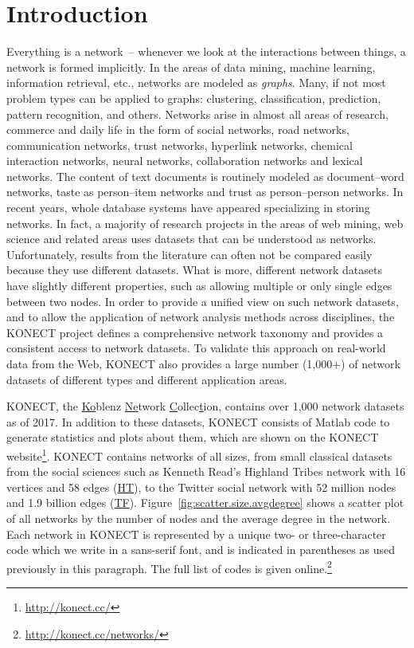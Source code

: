 \documentclass{article}
\begin{document}
\section{Introduction}
Everything is a network~-- whenever we look at the interactions between
things, a network is formed implicitly.  In the areas of data mining,
machine learning, information retrieval, etc., networks are modeled
as \emph{graphs}.  Many, if not most problem types can be applied to
graphs: clustering, classification, prediction, pattern recognition, and
others.  Networks arise in almost all areas of research, commerce and
daily life in the form of social networks, road networks, communication
networks, trust networks, hyperlink networks, chemical interaction
networks, neural networks, collaboration networks and lexical networks.
The content of text documents is routinely modeled as document--word
networks, taste as person--item networks and trust as person--person
networks.  In recent years, whole database systems have appeared
specializing in storing networks.  In fact, a majority of research
projects in the areas of web mining, web science and related areas uses
datasets that can be understood as networks.  Unfortunately, results
from the literature can often not be compared easily because
they use different datasets. What is more, different network datasets
have slightly different properties, such as allowing multiple or only
single edges between two nodes.  In order to provide a unified view on
such network datasets, and to allow the application of network analysis
methods across disciplines, the KONECT project defines a comprehensive
network taxonomy and provides a consistent access to network datasets.
To validate this approach on real-world data from the Web, KONECT
also provides a large number (1,000+) of network datasets of different
types and different application areas. 

KONECT, the \underline{Ko}blenz \underline{Ne}twork \underline
Collec\underline tion, contains over 1,000 network datasets as of 2017.
In addition to these datasets, KONECT consists of Matlab code to
generate statistics and plots about them, which are shown on the
KONECT
website\footnote{\href{http://konect.cc/}{http://konect.cc/}}.
KONECT contains networks of all sizes, from small classical datasets
from the social sciences such as Kenneth Read's Highland Tribes network
with 16 vertices and 58 edges
(\href{http://konect.cc/networks/ucidata-gama/}{\textsf{HT}}),
to the Twitter social network with 52 million nodes and 1.9 billion
edges
(\href{http://konect.cc/networks/twitter_mpi/}{\textsf{TF}}).
Figure~\ref{fig:scatter.size.avgdegree} shows a scatter plot of all
networks by the number of nodes and the average degree in the network.
Each network in KONECT is represented by a unique two- or
three-character code which we write in a \textsf{sans-serif font}, and
is indicated in parentheses as used previously in this paragraph. The
full list of codes is given
online.\footnote{\href{http://konect.cc/networks/}{http://konect.cc/networks/}}
\end{document}
